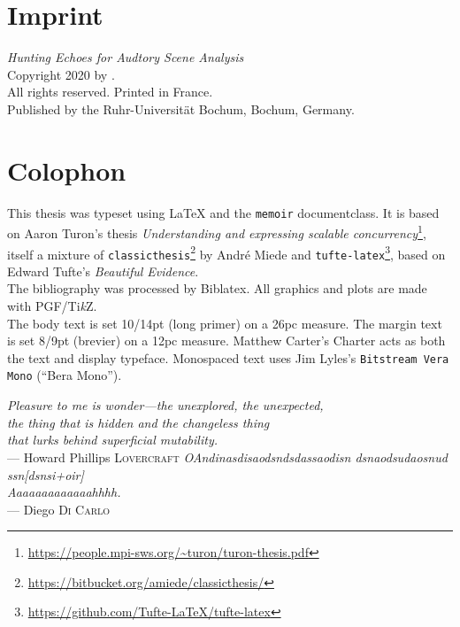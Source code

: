 \clearpage{}

\thispagestyle{empty}
\hphantom{.}
\vfill

\section*{Imprint}

\textit{Hunting Echoes for Audtory Scene Analysis}\\
Copyright \textcopyright{} 2020 by \theauthor{}.\\
All rights reserved. Printed in France.\\
Published by the Ruhr-Universität Bochum, Bochum, Germany.

\section*{Colophon}

This thesis was typeset using \LaTeX{} and the \texttt{memoir} documentclass.
It is based on Aaron Turon's thesis \emph{Understanding and expressing scalable concurrency}\footnote{\url{https://people.mpi-sws.org/~turon/turon-thesis.pdf}}, itself a mixture of \texttt{classicthesis}\footnote{\url{https://bitbucket.org/amiede/classicthesis/}} by Andr\'e Miede and \texttt{tufte-latex}\footnote{\url{https://github.com/Tufte-LaTeX/tufte-latex}}, based on Edward Tufte's \emph{Beautiful Evidence}.\\[0.5\baselineskip]
%
The bibliography was processed by Biblatex.
All graphics and plots are made with PGF/Ti\emph{k}Z.\\[0.5\baselineskip]
%
The body text is set 10/14pt (long primer) on a 26pc measure.
The margin text is set 8/9pt (brevier) on a 12pc measure.
Matthew Carter's \textrm{Charter} acts as both the text and display typeface.
Monospaced text uses Jim Lyles's \texttt{Bitstream Vera Mono} (\enquote{Bera Mono}).

\clearpage{}

\thispagestyle{empty}
\vphantom{.}
\vfill
{%
    \flushright{}
    \emph{Pleasure to me is wonder—the unexplored, the unexpected, \\
    the thing that is hidden and the changeless thing\\
    that lurks behind superficial mutability.}\\
    \hfill--- Howard Phillips \textsc{Lovercraft}
}
\vfill
{%
\flushright{}
\emph{OAndinasdisaodsnd{sdassaodisn
dsnaodsudaosnud ssn[dsnsi+oir]\\
Aaaaaaaaaaaaahhhh}.}\\
\hfill--- Diego \textsc{Di Carlo}
}
\vfill
\vfill

\clearpage{}

